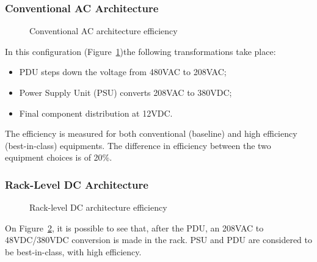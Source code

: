             \subsubsection*{Conventional AC Architecture}
                \begin{figure}[h!tb]
                    \centering
                    \caption{Conventional AC architecture efficiency}
                    \label{fig:conventional_ac_efficiency}
                \end{figure}
                In this configuration (Figure~\ref{fig:conventional_ac_efficiency})the following transformations take place:
                \begin{itemize}
	                \item PDU steps down the voltage from 480VAC to 208VAC;
                    \item Power Supply Unit (PSU) converts 208VAC to 380VDC;
                    \item Final component distribution at 12VDC.
                \end{itemize}
                The efficiency is measured for both conventional (baseline) and high efficiency (best-in-class) equipments. The difference in efficiency between the two equipment choices is of 20\%.

            \subsubsection*{Rack-Level DC Architecture}
                \begin{figure}[h!tb]
                    \centering
                    \caption{Rack-level DC architecture efficiency}
                    \label{fig:rack_level_dc_efficiency}
                \end{figure}
                On Figure~\ref{fig:rack_level_dc_efficiency}, it is possible to see that, after the PDU, an 208VAC to 48VDC/380VDC conversion is made in the rack. PSU and PDU are considered to be best-in-class, with high efficiency.

